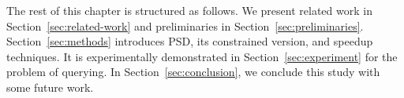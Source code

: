 The rest of this chapter is structured as follows. 
We present related work in Section~\ref{sec:related-work} and preliminaries in Section~\ref{sec:preliminaries}. 
Section~\ref{sec:methods} introduces PSD, its constrained version, and speedup techniques.
It is experimentally demonstrated in Section~\ref{sec:experiment} for the problem of querying. 
In Section~\ref{sec:conclusion}, we conclude this study with some future work. 
